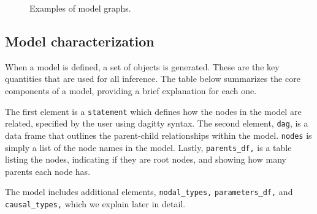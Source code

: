 \documentclass[
  11pt,
  article]{jss}
\begin{document}
\begin{figure}

\begin{minipage}[t]{0.50\linewidth}

{\centering 


}

\end{minipage}%
%
\begin{minipage}[t]{0.50\linewidth}

{\centering 


}

\end{minipage}%

\caption{\label{fig-plots}Examples of model graphs.}

\end{figure}

\hypertarget{model-characterization}{%
\subsection{Model characterization}\label{model-characterization}}

When a model is defined, a set of objects is generated. These are the
key quantities that are used for all inference. The table below
summarizes the core components of a model, providing a brief explanation
for each one.

The first element is a \texttt{statement} which defines how the nodes in
the model are related, specified by the user using dagitty syntax. The
second element, \texttt{dag}, is a data frame that outlines the
parent-child relationships within the model. \texttt{nodes} is simply a
list of the node names in the model. Lastly, \texttt{parents\_df,} is a
table listing the nodes, indicating if they are root nodes, and showing
how many parents each node has.

The model includes additional elements, \texttt{nodal\_types,}
\texttt{parameters\_df,} and \texttt{causal\_types,} which we explain
later in detail.
\end{document}
